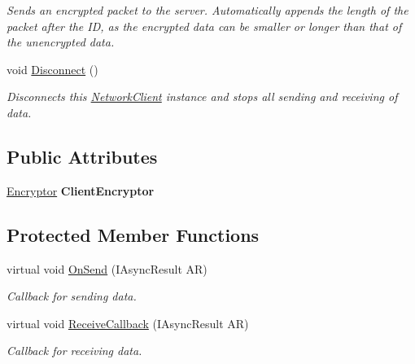 \begin{DoxyCompactItemize}
\begin{DoxyCompactList}\small\item\em Sends an encrypted packet to the server. Automatically appends the length of the packet after the I\+D, as the encrypted data can be smaller or longer than that of the unencrypted data. \end{DoxyCompactList}\item 
void \hyperlink{class_gonzo_net_1_1_network_client_a4670e881f97e68bc2f1112bbbfed8055}{Disconnect} ()
\begin{DoxyCompactList}\small\item\em Disconnects this \hyperlink{class_gonzo_net_1_1_network_client}{Network\+Client} instance and stops all sending and receiving of data. \end{DoxyCompactList}\end{DoxyCompactItemize}
\subsection*{Public Attributes}
\begin{DoxyCompactItemize}
\item 
\hypertarget{class_gonzo_net_1_1_network_client_aa951c6ce6f6c9752655712fb3615d167}{\hyperlink{class_gonzo_net_1_1_encryption_1_1_encryptor}{Encryptor} {\bfseries Client\+Encryptor}}\label{class_gonzo_net_1_1_network_client_aa951c6ce6f6c9752655712fb3615d167}

\end{DoxyCompactItemize}
\subsection*{Protected Member Functions}
\begin{DoxyCompactItemize}
\item 
virtual void \hyperlink{class_gonzo_net_1_1_network_client_a4e4979f3d5f0f46c18c6ad31c49dac02}{On\+Send} (I\+Async\+Result A\+R)
\begin{DoxyCompactList}\small\item\em Callback for sending data. \end{DoxyCompactList}\item 
virtual void \hyperlink{class_gonzo_net_1_1_network_client_aab7152d308ece90be6604d157025a59b}{Receive\+Callback} (I\+Async\+Result A\+R)
\begin{DoxyCompactList}\small\item\em Callback for receiving data. \end{DoxyCompactList}\end{DoxyCompactItemize}
